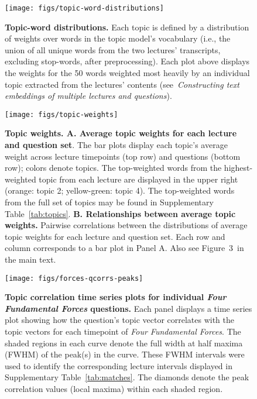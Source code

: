 \documentclass[10pt]{article}
\newcommand{\topicVariability}{3}
\newcommand{\topicModelMethods}{\textit{Constructing text embeddings of multiple lectures and questions}}
\begin{document}
\begin{figure}[tp]
    \texttt{[image: figs/topic-word-distributions]}

    \caption{\textbf{Topic-word distributions.} Each topic is defined by a distribution 
    of weights over words in the topic model's vocabulary (i.e., the union of all unique 
    words from the two lectures' transcripts, excluding stop-words, after 
    preprocessing). Each plot above displays the weights for the 50 words 
    weighted most heavily by an individual topic extracted from the lectures' contents 
    (see~\topicModelMethods).}

    \label{fig:topic-word-distributions}
\end{figure}


\begin{figure}[tp]
    \texttt{[image: figs/topic-weights]}

    \caption{\textbf{Topic weights. A. Average topic weights for each lecture and
    question set}. The bar plots display each topic's average weight across
    lecture timepoints (top row) and questions (bottom row); colors denote topics.
    The top-weighted words from the highest-weighted topic from each lecture are
    displayed in the upper right (orange: topic 2; yellow-green: topic 4). The
    top-weighted words from the full set of topics may be found in Supplementary
    Table~\ref{tab:topics}. \textbf{B. Relationships between average topic
    weights.} Pairwise correlations between the distributions of average topic
    weights for each lecture and question set. Each row and column corresponds
    to a bar plot in Panel A. Also see Figure~\topicVariability~in the main text.}

    \label{fig:topics}
\end{figure}


\begin{figure}[tp]
    \centering
    \texttt{[image: figs/forces-qcorrs-peaks]}

    \caption{\textbf{Topic correlation time series plots for individual
    \textit{Four Fundamental Forces} questions.} Each panel displays a
    time series plot showing how the question's topic vector correlates with the
    topic vectors for each timepoint of \textit{Four Fundamental Forces}. The
    shaded regions in each curve denote the full width at half maxima (FWHM)
    of the peak(s) in the curve. These FWHM intervals were used to identify the
    corresponding lecture intervals displayed in Supplementary
    Table~\ref{tab:matches}. The diamonds denote the peak correlation values
    (local maxima) within each shaded region.}
    \label{fig:forces-peaks}
\end{figure}
\end{document}
